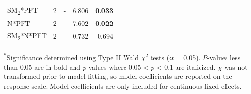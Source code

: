 \begin{table}
\begin{tabular}{p{6cm}p{0.5cm}p{2cm}p{1.5cm}p{1.5cm}}
            SM\textsubscript{2}*PFT
            & \multicolumn{1}{r}{2}
            & \multicolumn{1}{r}{-}
            & \multicolumn{1}{r}{6.806}
            & \multicolumn{1}{r}{\textbf{0.033}}
            \\

            N*PFT
            & \multicolumn{1}{r}{2}
            & \multicolumn{1}{r}{-}
            & \multicolumn{1}{r}{7.602}
            & \multicolumn{1}{r}{\textbf{0.022}}
            \\

            SM\textsubscript{2}*N*PFT
            & \multicolumn{1}{r}{2}
            & \multicolumn{1}{r}{-}
            & \multicolumn{1}{r}{0.732}
            & \multicolumn{1}{r}{0.694}
            \\
            \hline
        \end{tabular}%
    \label{tab:table4.3}
\end{table}
\noindent \textsuperscript{$*$}Significance determined using Type II Wald $\chi^{2}$ tests ($\alpha$ = 0.05). \textit{P}-values less than 0.05 are in bold and \textit{p}-values where 0.05 < \textit{p} < 0.1 are italicized. $\chi$ was not transformed prior to model fitting, so model coefficients are reported on the response scale. Model coefficients are only included for continuous fixed effects.
\clearpage

